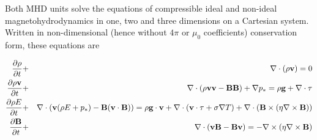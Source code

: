 Both MHD units solve the equations of compressible ideal and non-ideal magnetohydrodynamics
in one, two and three dimensions on a Cartesian system.
Written in non-dimensional (hence without $4\pi$ or $\mu_0$
coefficients) conservation form, these equations are

\begin{eqnarray}
\frac{\partial\rho}{\partial t} & +
& \nabla\cdot(\rho\textbf{v}) = 0 \label{Eqn:continuity}\\
\frac{\partial\rho\textbf{v}}{\partial t} & + & \nabla\cdot
(\rho\textbf{v}\textbf{v}-\textbf{B}\textbf{B})+\nabla p_{\ast} = \rho\textbf{g} + \nabla\cdot{\bf \tau} \label{Eqn:momentum}\\
\frac{\partial \rho E}{\partial t} & + & \nabla\cdot(\textbf{v}(\rho E+ p_{\ast})-
\textbf{B}(\textbf{v}\cdot\textbf{B})) = \rho\textbf{g}\cdot\textbf{v} + \nabla\cdot(\textbf{v}\cdot{\bf \tau}+
\sigma\nabla T) + \nabla\cdot(\textbf{B}\times(\eta\nabla\times\textbf{B}))\label{Eqn:energy}\\
\frac{\partial \textbf{B}}{\partial t} & + & \nabla\cdot(\textbf{v}\textbf{B}-\textbf{B}\textbf{v}) =
-\nabla\times(\eta\nabla\times\textbf{B})\label{Eqn:induction}
\end{eqnarray}
